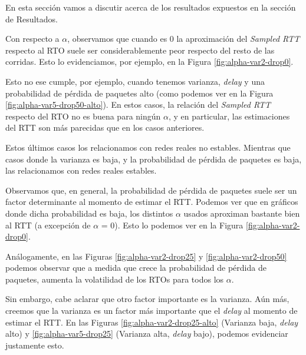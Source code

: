 
En esta sección vamos a discutir acerca de los resultados expuestos en la sección de Resultados.

% 

Con respecto a $\alpha$, observamos que cuando es 0 la aproximación del \emph{Sampled RTT} respecto al RTO suele ser considerablemente peor respecto del resto de las corridas. Esto lo evidenciamos, por ejemplo, en la Figura \ref{fig:alpha-var2-drop0}.

Esto no ese cumple, por ejemplo, cuando tenemos varianza, \emph{delay} y una probabilidad de pérdida de paquetes alto (como podemos ver en la Figura \ref{fig:alpha-var5-drop50-alto}). En estos casos, la relación del \emph{Sampled RTT} respecto del RTO no es buena para ningún $\alpha$, y en particular, las estimaciones del RTT son más parecidas que en los casos anteriores. 

Estos últimos casos los relacionamos con redes reales no estables. Mientras que casos donde la varianza es baja, y la probabilidad de pérdida de paquetes es baja, las relacionamos con redes reales estables.

Observamos que, en general, la probabilidad de pérdida de paquetes suele ser un factor determinante al momento de estimar el RTT. Podemos ver que en gráficos donde dicha probabilidad es baja, los distintos $\alpha$ usados aproximan bastante bien al RTT (a excepción de $\alpha$ = 0). Esto lo podemos ver en la Figura \ref{fig:alpha-var2-drop0}.

Análogamente, en las Figuras \ref{fig:alpha-var2-drop25} y \ref{fig:alpha-var2-drop50} podemos observar que a medida que crece la probabilidad de pérdida de paquetes, aumenta la volatilidad de los RTOs para todos los $\alpha$.

Sin embargo, cabe aclarar que otro factor importante es la varianza. Aún más, creemos que la varianza es un factor más importante que el \emph{delay} al momento de estimar el RTT. En las Figuras \ref{fig:alpha-var2-drop25-alto} (Varianza baja, \emph{delay} alto) y \ref{fig:alpha-var5-drop25} (Varianza alta, \emph{delay} bajo), podemos evidenciar justamente esto.

